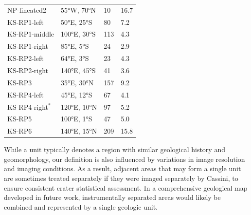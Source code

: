 \documentclass[preprint,11pt,3p,times,authoryear]{elsarticle}
\begin{document}
\begin{table}[ht!]
\begin{tabular}{p{4.0cm} p{3.0cm} p{2.0cm} p{3.0cm} }
  NP-lineated2 & 55°W, 70°N & 10 &  16.7\\
  KS-RP1-left & 50°E, 25°S & 80 &  7.2\\
  KS-RP1-middle & 100°E, 30°S & 113 &  4.3\\
  KS-RP1-right & 85°E, 5°S & 24 &  2.9\\
  KS-RP2-left & 64°E, 3°S & 23 &  4.3\\
  KS-RP2-right & 140°E, 45°S & 41 &  3.6\\
  KS-RP3 & 35°E, 30°N & 157 &  9.2\\
  KS-RP4-left & 45°E, 12°S & 67 & 4.1 \\
  KS-RP4-right$^{*}$ & 120°E, 10°N & 97 & 5.2 \\
  KS-RP5 & 100°E, 1°S & 47 &  5.0 \\
  KS-RP6 & 140°E, 15°N & 209 & 15.8 \\
\hline
\end{tabular}
\label{tab:analytical_units}
\end{table}

While a unit typically denotes a region with similar geological history and geomorphology, our definition is also influenced by variations in image resolution and imaging conditions. As a result, adjacent areas that may form a single unit are sometimes treated separately if they were imaged separately by Cassini, to ensure consistent crater statistical assessment. In a comprehensive geological map developed in future work, instrumentally separated areas would likely be combined and represented by a single geologic unit.

\end{document}
